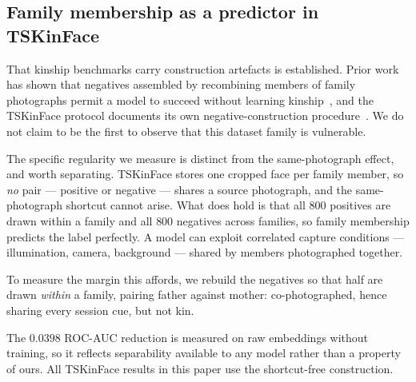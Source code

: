 \documentclass[journal,12pt]{IEEEtran}
\begin{document}
\subsection{Family membership as a predictor in TSKinFace}

That kinship benchmarks carry construction artefacts is established. Prior work
has shown that negatives assembled by recombining members of family photographs
permit a model to succeed without learning
kinship~\cite{dawson2018samephoto}, and the TSKinFace protocol documents its own
negative-construction procedure~\cite{qin2015tri}. We do not claim to be the
first to observe that this dataset family is vulnerable.

The specific regularity we measure is distinct from the same-photograph effect,
and worth separating. TSKinFace stores one cropped face per family member, so
\emph{no} pair --- positive or negative --- shares a source photograph, and the
same-photograph shortcut cannot arise. What does hold is that all $800$
positives are drawn within a family and all $800$ negatives across families, so
family membership predicts the label perfectly. A model can exploit correlated
capture conditions --- illumination, camera, background --- shared by members
photographed together.

To measure the margin this affords, we rebuild the negatives so that half are
drawn \emph{within} a family, pairing father against mother: co-photographed,
hence sharing every session cue, but not kin.

\begin{table}[t]
\caption{TSKinFace pair construction. Under the standard protocol family
membership predicts the label perfectly; no pair shares a source photograph in
either construction.}
\label{tab:ts}
\centering
{}
\end{table}

The $0.0398$ ROC-AUC reduction is measured on raw embeddings without training,
so it reflects separability available to any model rather than a property of
ours. All TSKinFace results in this paper use the shortcut-free construction.
\end{document}
